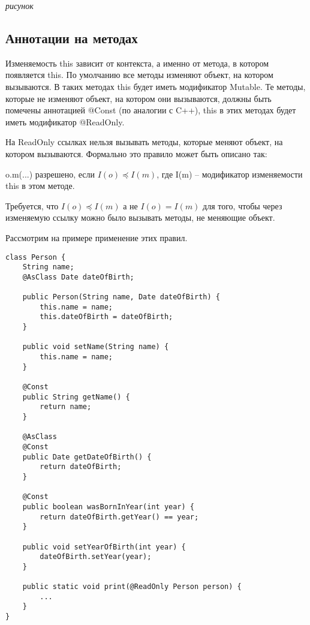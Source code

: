\textit{рисунок} 

\subsection{Аннотации на методах}

Изменяемость this зависит от контекста, а именно от метода, в котором появляется this. По умолчанию все методы изменяют объект, на котором вызываются. В таких методах this будет иметь модификатор Mutable. Те методы, которые не изменяют объект, на котором они вызываются, должны быть помечены аннотацией @Const (по аналогии с C++), this в этих методах будет иметь модификатор @ReadOnly.

На ReadOnly ссылках нельзя вызывать методы, которые меняют объект, на котором вызываются. Формально это правило может быть описано так:

\begin{Rule}\label{rule:invoke_method}
o.m(...) разрешено, если $I(o) \preceq I(m)$, где I(m) -- модификатор изменяемости this в этом методе.
\end{Rule}

Требуется, что $I(o) \preceq I(m)$ а не $I(o) = I(m)$ для того, чтобы через изменяемую ссылку можно было вызывать методы, не меняющие объект. 

Рассмотрим на примере применение этих правил.

\begin{lstlisting}[caption=Аннотации на методах, label=code:method_annotations]
class Person {
    String name;
    @AsClass Date dateOfBirth;	
    
    public Person(String name, Date dateOfBirth) {
    	this.name = name;
    	this.dateOfBirth = dateOfBirth;
    }
    
    public void setName(String name) {
        this.name = name;
    }
    
    @Const
    public String getName() {
        return name;
    }
    
    @AsClass
    @Const
    public Date getDateOfBirth() {
        return dateOfBirth;
    }
    
    @Const 
    public boolean wasBornInYear(int year) {
    	return dateOfBirth.getYear() == year;
    }
    
    public void setYearOfBirth(int year) {
        dateOfBirth.setYear(year);
    }
    
    public static void print(@ReadOnly Person person) {
        ...
    }
}
\end{lstlisting} 

